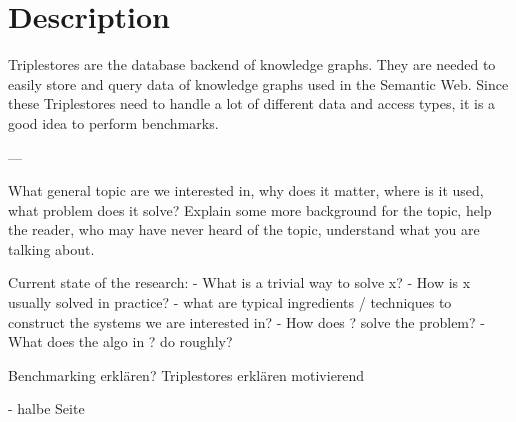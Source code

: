 \chapter{Description}
\label{ch:description}

Triplestores are the database backend of knowledge graphs. 
They are needed to easily store and query data of knowledge graphs used in the Semantic Web.
Since these Triplestores need to handle a lot of different data and access types, it is a good idea to perform benchmarks.




---

What general topic are we interested in, why does it matter, where is it used, what problem does it solve?
Explain some more background for the topic, help the reader, who may have never heard of the topic, understand what you are talking about.

Current state of the research:
- What is a trivial way to solve x?
- How is x usually solved in practice?
- what are typical ingredients / techniques to construct the systems we are interested in?
- How does ? solve the problem?
- What does the algo in ? do roughly?


Benchmarking erklären?
Triplestores erklären motivierend


- halbe Seite

